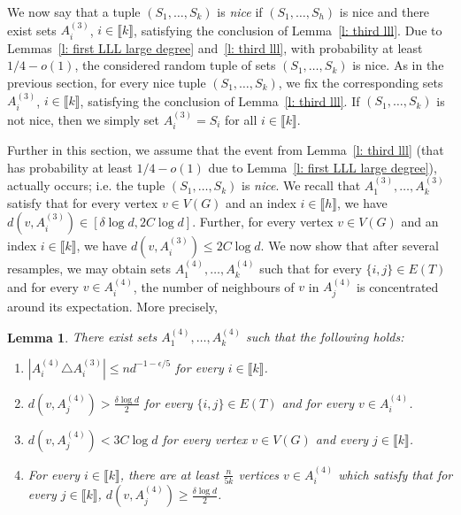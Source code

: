 \documentclass[notitlepage]{scrartcl}
\newcommand{\br}[1]{\llbracket{#1}\rrbracket}
\newtheorem{lemma}[thm]{Lemma}
\begin{document}
We now say that a tuple $(S_1,\ldots,S_k)$ is \emph{nice} if $(S_1,\ldots,S_h)$ is nice and there exist sets $A_i^{(3)}$, $i\in \br{k}$, satisfying the conclusion of Lemma~\ref{l: third lll}. Due to Lemmas~\ref{l: first LLL large degree} and~\ref{l: third lll}, with probability at least $1/4-o(1)$, the considered random tuple of sets $(S_1,\ldots,S_k)$ is nice. As in the previous section, for every nice tuple $(S_1,\ldots,S_k)$, we fix the corresponding sets $A_i^{(3)}$, $i\in \br{k}$, satisfying the conclusion of Lemma~\ref{l: third lll}. If $(S_1,\ldots,S_k)$ is not nice, then we simply set $A_i^{(3)}=S_i$ for all $i\in \br{k}$.


Further in this section, we assume that the event from Lemma~\ref{l: third lll} (that has probability at least $1/4-o(1)$ due to Lemma~\ref{l: first LLL large degree}), actually occurs; i.e. the tuple $(S_1,\ldots,S_k)$ is \emph{nice}. %
 We recall that $A_1^{(3)},\ldots, A_k^{(3)}$ satisfy that for every vertex $v \in V(G)$ and an index $i \in \br{h}$, we have $d(v, A_i^{(3)}) \in [\delta \log d, 2C \log d]$. Further, for every vertex $v \in V(G)$ and an index $i\in \br{k}$, we have $d(v, A_i^{(3)}) \le 2C \log d$. We now show that after several resamples, we may obtain sets $A_1^{(4)}, \ldots, A_k^{(4)}$ such that for every $\{i, j\} \in E(T)$ and for every $v \in A_i^{(4)}$, the number of neighbours of $v$ in $A_j^{(4)}$ is concentrated around its expectation. More precisely, 
\begin{lemma}\label{l: no b}
There exist sets $A_1^{(4)}, \dots, A_k^{(4)}$ such that the following holds:
    \begin{enumerate}
        \item $\left|A_i^{(4)}\triangle A_i^{(3)}\right|\le nd^{-1-\epsilon/5}$ for every $i\in \br{k}$.\label{l: no b item}
        \item $d(v, A_j^{(4)}) > \frac{\delta \log d}{2}$ for every $\{i,j\} \in E(T)$ and for every $v \in A_i^{(4)}$.
        \item $d(v, A_j^{(4)}) < 3C \log d$ for every vertex $v \in V(G)$ and every $j \in \br{k}$.
        \item For every $i\in \br{k}$, there are at least $\frac{n}{5k}$ vertices $v\in A_i^{(4)}$ which satisfy that for every $j\in \br{k}$, $d(v,A_j^{(4)})\ge \frac{\delta\log d}{2}$. 
    \end{enumerate}
\end{lemma}
\end{document}
